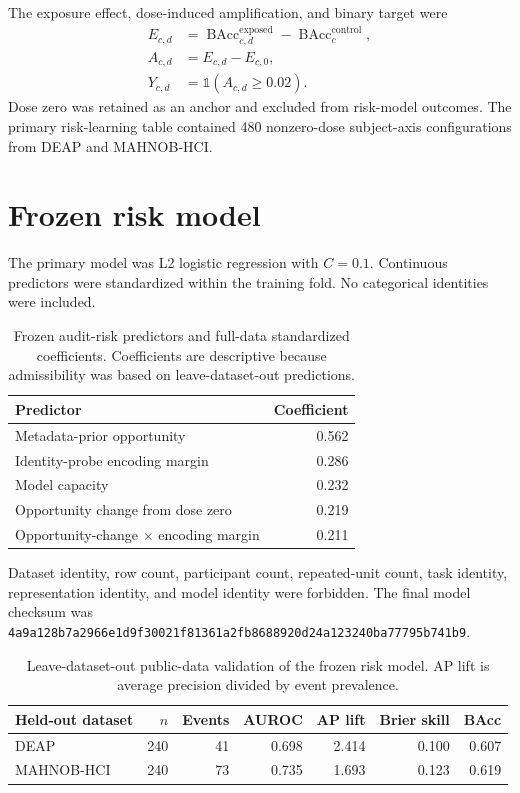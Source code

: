 \documentclass[preprint,12pt]{elsarticle}
\begin{document}
The exposure effect, dose-induced amplification, and binary target were
\begin{align}
E_{c,d}&=\operatorname{BAcc}^{\mathrm{exposed}}_{c,d}-\operatorname{BAcc}^{\mathrm{control}}_c,\\
A_{c,d}&=E_{c,d}-E_{c,0},\\
Y_{c,d}&=\mathbb{1}(A_{c,d}\geq0.02).
\end{align}
Dose zero was retained as an anchor and excluded from risk-model outcomes. The primary risk-learning table contained 480 nonzero-dose subject-axis configurations from DEAP and MAHNOB-HCI.

\section{Frozen risk model}

The primary model was L2 logistic regression with $C=0.1$. Continuous predictors were standardized within the training fold. No categorical identities were included.

\begin{table}[h]
\centering
\caption{Frozen audit-risk predictors and full-data standardized coefficients. Coefficients are descriptive because admissibility was based on leave-dataset-out predictions.}
\small
\begin{tabular}{lr}
\toprule
Predictor & Coefficient \\
\midrule
Metadata-prior opportunity & 0.562 \\
Identity-probe encoding margin & 0.286 \\
Model capacity & 0.232 \\
Opportunity change from dose zero & 0.219 \\
Opportunity-change $\times$ encoding margin & 0.211 \\
\bottomrule
\end{tabular}
\end{table}

Dataset identity, row count, participant count, repeated-unit count, task identity, representation identity, and model identity were forbidden. The final model checksum was \texttt{4a9a128b7a2966e1d9f30021f81361a2}\allowbreak\texttt{fb8688920d24a123240ba77795b741b9}.

\begin{table}[h]
\centering
\caption{Leave-dataset-out public-data validation of the frozen risk model. AP lift is average precision divided by event prevalence.}
\small
\begin{tabular}{lrrrrrr}
\toprule
Held-out dataset & $n$ & Events & AUROC & AP lift & Brier skill & BAcc \\
\midrule
DEAP & 240 & 41 & 0.698 & 2.414 & 0.100 & 0.607 \\
MAHNOB-HCI & 240 & 73 & 0.735 & 1.693 & 0.123 & 0.619 \\
\bottomrule
\end{tabular}
\end{table}
\end{document}
